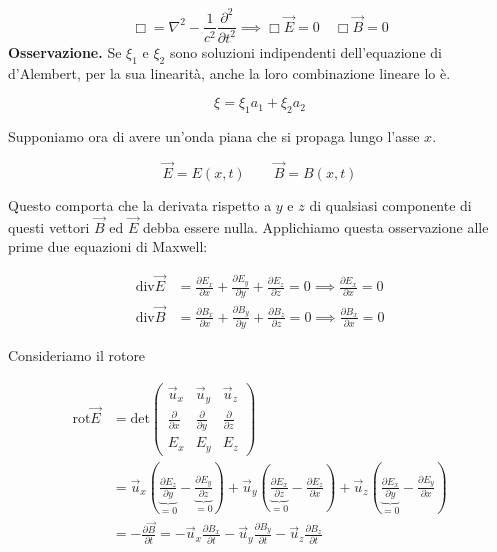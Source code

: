 \[
	\boxed{\Box = \nabla^2 - \frac{1}{c^2} \frac{\partial^2}{\partial t^2}  \implies  \Box \vec{E} = 0 \quad \Box \vec{B} = 0}
\]
\textbf{Osservazione.} Se $\xi_1$ e $\xi_2$ sono soluzioni indipendenti dell'equazione di d'Alembert, per la sua linearità, anche la loro combinazione lineare lo è.

\[
	\xi = \xi_1a_1 + \xi_2a_2
\]

Supponiamo ora di avere un'onda piana che si propaga lungo l'asse $x$.

\[
	\vec{E} = E(x,t) \qquad \vec{B} = B(x,t)
\]

Questo comporta che la derivata rispetto a $y$ e $z$ di qualsiasi componente di questi vettori $\vec{B}$ ed $\vec{E}$ debba essere nulla. Applichiamo questa osservazione alle prime due equazioni di Maxwell:

\begin{equation*}
	\begin{aligned}
		\text{div}\vec{E} &= \frac{\partial E_x}{\partial x} + \frac{\partial E_y}{\partial y} + \frac{\partial E_z}{\partial z}  = 0 \implies \frac{\partial E_x}{\partial x} = 0 \\
		\text{div}\vec{B} &= \frac{\partial B_x}{\partial x} + \frac{\partial B_y}{\partial y} + \frac{\partial B_z}{\partial z}  = 0 \implies \frac{\partial B_x}{\partial x} = 0
	\end{aligned}
\end{equation*}

Consideriamo il rotore

\begin{equation*}
	\begin{aligned}
		\text{rot}\vec{E} &= \text{det} \begin{pmatrix}
		\vec{u}_x & \vec{u}_y & \vec{u}_z \\
		\frac{\partial}{\partial x}  &  \frac{\partial}{\partial y} & \frac{\partial}{\partial z} \\
		E_x & E_y & E_z
	\end{pmatrix} \\
	&= \vec{u}_x\left( \underbrace{\frac{\partial E_z}{\partial y}}_{=0} - \underbrace{\frac{\partial E_y}{\partial z}}_{=0}  \right) + \vec{u}_y \left( \underbrace{\frac{\partial E_x}{\partial z}}_{=0} - \frac{\partial E_z}{\partial x}  \right) + \vec{u}_z \left( \underbrace{\frac{\partial E_x}{\partial y}}_{=0} - \frac{\partial E_y}{\partial x}  \right)  \\
	&=-\frac{\partial \vec{B}}{\partial t} = - \vec{u}_x\frac{\partial B_x}{\partial t} - \vec{u}_y\frac{\partial B_y}{\partial t} - \vec{u}_z\frac{\partial B_z}{\partial t}
	\end{aligned}
\end{equation*}

